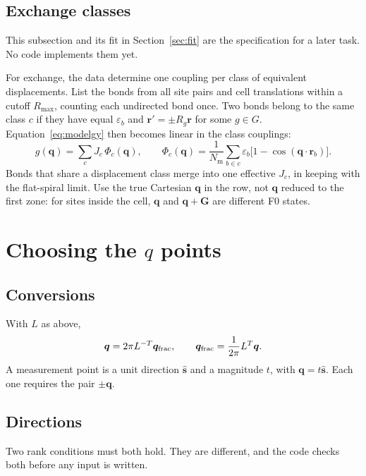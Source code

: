 \documentclass[11pt,a4paper]{article}
\numberwithin{equation}{section}
\newcommand{\vct}[1]{\bm{#1}}
\newcommand{\qh}{\vct q}
\newcommand{\sh}{\hat{\vct s}}
\newcommand{\Nm}{N_{\mathrm m}}
\begin{document}
\subsection{Exchange classes}\label{sec:classes}

This subsection and its fit in Section~\ref{sec:fit} are the specification for a
later task. No code implements them yet.

For exchange, the data determine one coupling per class of equivalent
displacements. List the bonds from all site pairs and cell translations within
a cutoff $R_{\max}$, counting each undirected bond once. Two bonds belong to the same class $c$ if they have equal
$\varepsilon_b$ and $\vct r'=\pm R_g\vct r$ for some $g\in G$. Equation~\eqref{eq:modelgy}
then becomes linear in the class couplings:
\begin{equation}\label{eq:classes}
 \boxed{g(\qh)=\sum_cJ_c\,\Phi_c(\qh),\qquad
 \Phi_c(\qh)=\frac{1}{\Nm}\sum_{b\in c}\varepsilon_b
 \bigl[1-\cos(\qh\cdot\vct r_b)\bigr].}
\end{equation}
Bonds that share a displacement class merge into one effective $J_c$, in
keeping with the flat-spiral limit. Use the true Cartesian $\qh$ in the row, not
$\qh$ reduced to the first zone: for sites inside the cell, $\qh$ and
$\qh+\vct G$ are different F0 states.

\section{Choosing the \(q\) points}\label{sec:qplan}

\subsection{Conversions}

With $L$ as above,
\begin{equation}\label{eq:qconvert}
 \qh=2\pi L^{-T}\qh_{\rm frac},\qquad
 \qh_{\rm frac}=\frac{1}{2\pi}L^{T}\qh.
\end{equation}
A measurement point is a unit direction $\sh$ and a magnitude $t$, with
$\qh=t\sh$. Each one requires the pair $\pm\qh$.

\subsection{Directions}

Two rank conditions must both hold. They are different, and the code checks both
before any input is written.
\end{document}
